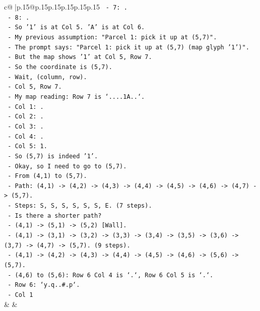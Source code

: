 \documentclass{article}
\begin{document}
{\begin{supertabular}{c@{$\;$}|p{.15\linewidth}@{}p{.15\linewidth}p{.15\linewidth}p{.15\linewidth}p{.15\linewidth}p{.15\linewidth}}
{{{\texttt{       {-} 7: .} \\
\texttt{       {-} 8: .} \\
\texttt{       {-} So '1' is at Col 5. 'A' is at Col 6.} \\
\texttt{       {-} My previous assumption: "Parcel 1: pick it up at (5,7)".} \\
\texttt{       {-} The prompt says: "Parcel 1: pick it up at (5,7) (map glyph '1')".} \\
\texttt{       {-} But the map shows '1' at Col 5, Row 7.} \\
\texttt{       {-} So the coordinate is (5,7).} \\
\texttt{       {-} Wait, (column, row).} \\
\texttt{       {-} Col 5, Row 7.} \\
\texttt{       {-} My map reading: Row 7 is `....1A..`.} \\
\texttt{       {-} Col 1: .} \\
\texttt{       {-} Col 2: .} \\
\texttt{       {-} Col 3: .} \\
\texttt{       {-} Col 4: .} \\
\texttt{       {-} Col 5: 1.} \\
\texttt{       {-} So (5,7) is indeed '1'.} \\
\texttt{       {-} Okay, so I need to go to (5,7).} \\
\texttt{       {-} From (4,1) to (5,7).} \\
\texttt{       {-} Path: (4,1) {-}> (4,2) {-}> (4,3) {-}> (4,4) {-}> (4,5) {-}> (4,6) {-}> (4,7) {-}> (5,7).} \\
\texttt{       {-} Steps: S, S, S, S, S, S, E. (7 steps).} \\
\texttt{       {-} Is there a shorter path?} \\
\texttt{       {-} (4,1) {-}> (5,1) {-}> (5,2) {[}Wall{]}.} \\
\texttt{       {-} (4,1) {-}> (3,1) {-}> (3,2) {-}> (3,3) {-}> (3,4) {-}> (3,5) {-}> (3,6) {-}> (3,7) {-}> (4,7) {-}> (5,7). (9 steps).} \\
\texttt{       {-} (4,1) {-}> (4,2) {-}> (4,3) {-}> (4,4) {-}> (4,5) {-}> (4,6) {-}> (5,6) {-}> (5,7).} \\
\texttt{         {-} (4,6) to (5,6): Row 6 Col 4 is `.`, Row 6 Col 5 is `.`.} \\
\texttt{         {-} Row 6: `y.q..\#.p`.} \\
\texttt{         {-} Col 1} \\
            }
        }
    }
    & & \\ \\


\end{supertabular}}
\end{document}
